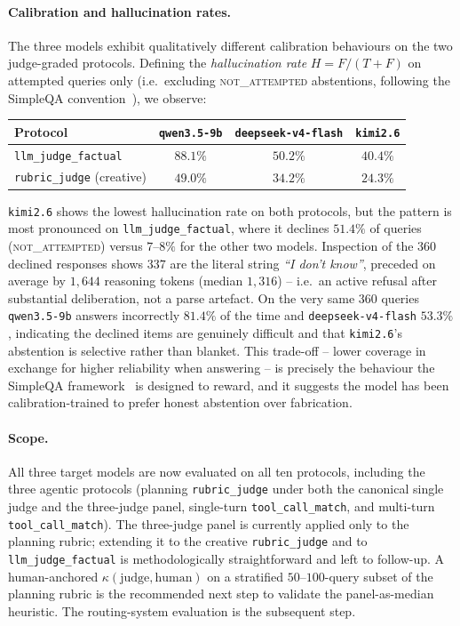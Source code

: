 \documentclass[11pt,a4paper]{article}
\begin{document}
\paragraph{Calibration and hallucination rates.}\label{sec:eval-calibration}
The three models exhibit qualitatively different calibration behaviours on the
two judge-graded protocols. Defining the \emph{hallucination rate}
$H = F / (T+F)$ on attempted queries only (i.e.\ excluding
\textsc{not\_attempted} abstentions, following the SimpleQA
convention~\cite{wei2024simpleqa}), we observe:

\begin{center}
\small
\begin{tabular}{l c c c}
\toprule
\textbf{Protocol} & \texttt{qwen3.5-9b} & \texttt{deepseek-v4-flash} & \texttt{kimi2.6} \\
\midrule
\texttt{llm\_judge\_factual}         & $88.1\%$ & $50.2\%$ & $\mathbf{40.4\%}$ \\
\texttt{rubric\_judge} (creative)    & $49.0\%$ & $34.2\%$ & $\mathbf{24.3\%}$ \\
\bottomrule
\end{tabular}
\end{center}

\noindent\texttt{kimi2.6} shows the lowest hallucination rate on both protocols,
but the pattern is most pronounced on \texttt{llm\_judge\_factual}, where it
declines $51.4\%$ of queries (\textsc{not\_attempted}) versus $7$--$8\%$ for the
other two models. Inspection of the $360$ declined responses shows
$337$ are the literal string \emph{``I don't know''}, preceded on average by
$1{,}644$ reasoning tokens (median $1{,}316$) -- i.e.\ an active refusal after
substantial deliberation, not a parse artefact. On the very same $360$ queries
\texttt{qwen3.5-9b} answers incorrectly $81.4\%$ of the time and
\texttt{deepseek-v4-flash} $53.3\%$, indicating the declined items are
genuinely difficult and that \texttt{kimi2.6}'s abstention is selective rather
than blanket. This trade-off -- lower coverage in exchange for higher
reliability when answering -- is precisely the behaviour the SimpleQA
framework~\cite{wei2024simpleqa} is designed to reward, and it suggests the
model has been calibration-trained to prefer honest abstention over fabrication.

\paragraph{Scope.} All three target models are now evaluated on all ten
protocols, including the three agentic protocols (planning
\texttt{rubric\_judge} under both the canonical single judge and the
three-judge panel, single-turn \texttt{tool\_call\_match}, and multi-turn
\texttt{tool\_call\_match}). The three-judge panel is currently applied only
to the planning rubric; extending it to the creative \texttt{rubric\_judge}
and to \texttt{llm\_judge\_factual} is methodologically straightforward and
left to follow-up. A human-anchored
$\kappa(\text{judge}, \text{human})$ on a stratified $50$--$100$-query subset
of the planning rubric is the recommended next step to validate the
panel-as-median heuristic. The routing-system evaluation is the subsequent
step.
\end{document}
